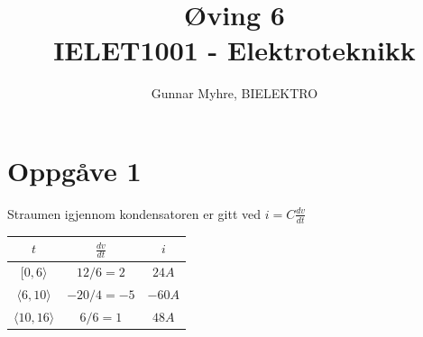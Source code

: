 \documentclass[12pt,a4paper]{article}
\title{%
  Øving 6 \\
  \large IELET1001 - Elektroteknikk \\
  }
\author{Gunnar Myhre, BIELEKTRO}
\begin{document}
  \maketitle
    
  \section{Oppgåve 1}
    Straumen igjennom kondensatoren er gitt ved $i=C\frac{dv}{dt}$
    \begin{center}
      \begin{tabular}{ |c|c|c| }
        \hline
        $t$ & $\frac{dv}{dt}$ & $i$ \\
        \hline
        $[0,6\rangle$ & $12/6=2$ & $24A$ \\
        \hline
        $\langle6,10\rangle$ & $-20/4=-5$ & $-60A$ \\
        \hline
        $\langle10,16\rangle$ & $6/6=1$ & $48A$ \\
        \hline
      \end{tabular}
    \end{center}

    \begin{center}
    \end{center}

  \newpage
\end{document}
